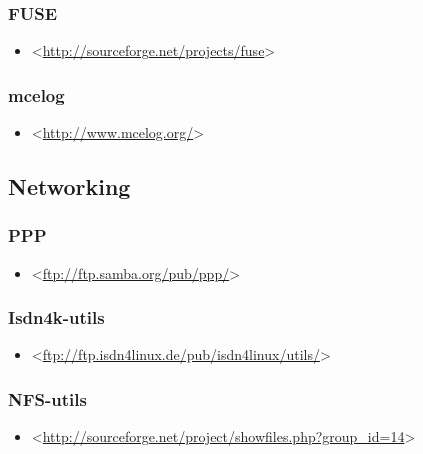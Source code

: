 \documentclass[a4paper,8pt,english]{sphinxmanual}
\begin{document}
\subsubsection{FUSE}
\label{process/changes:id21}\begin{itemize}
\item {} 
\textless{}\href{http://sourceforge.net/projects/fuse}{http://sourceforge.net/projects/fuse}\textgreater{}

\end{itemize}


\subsubsection{mcelog}
\label{process/changes:id22}\begin{itemize}
\item {} 
\textless{}\href{http://www.mcelog.org/}{http://www.mcelog.org/}\textgreater{}

\end{itemize}


\subsection{Networking}
\label{process/changes:id23}

\subsubsection{PPP}
\label{process/changes:id24}\begin{itemize}
\item {} 
\textless{}\href{ftp://ftp.samba.org/pub/ppp/}{ftp://ftp.samba.org/pub/ppp/}\textgreater{}

\end{itemize}


\subsubsection{Isdn4k-utils}
\label{process/changes:id25}\begin{itemize}
\item {} 
\textless{}\href{ftp://ftp.isdn4linux.de/pub/isdn4linux/utils/}{ftp://ftp.isdn4linux.de/pub/isdn4linux/utils/}\textgreater{}

\end{itemize}


\subsubsection{NFS-utils}
\label{process/changes:id26}\begin{itemize}
\item {} 
\textless{}\href{http://sourceforge.net/project/showfiles.php?group\_id=14}{http://sourceforge.net/project/showfiles.php?group\_id=14}\textgreater{}

\end{itemize}
\end{document}
